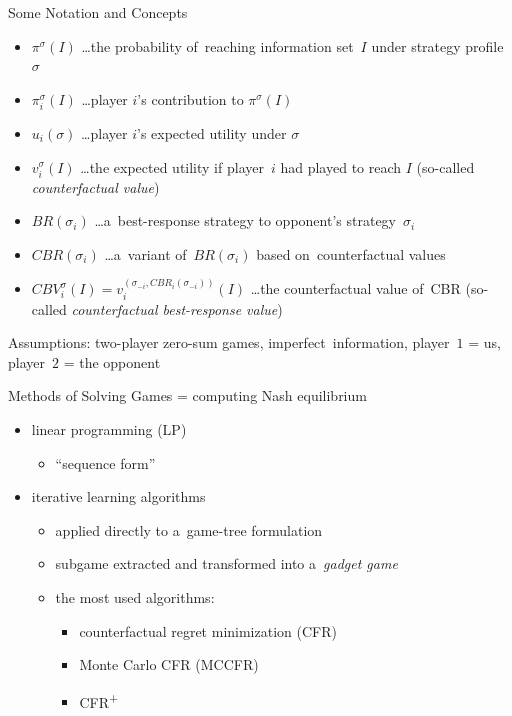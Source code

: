 \documentclass{beamer}
\theoremstyle{definition}
\newcommand{\cfrplus}{CFR\textsuperscript{+}~}
\begin{document}
  \begin{frame}{Some Notation and Concepts}
    \pause
    \begin{itemize}[<+- | alert@+>]
      \item $\pi^{\sigma}(I)$ \ldots the probability of~reaching information set~$I$ under strategy profile~$\sigma$
      \item $\pi_i^{\sigma}(I)$ \ldots player $i$'s contribution to $\pi^{\sigma}(I)$
      \item $u_i(\sigma)$ \ldots player $i$'s expected utility under $\sigma$
      \item $v _i ^{\sigma} (I)$ \ldots the expected utility if player~$i$ had played to reach $I$ (so-called \emph{counterfactual value})
      \item $BR(\sigma_i)$ \ldots a~best-response strategy to opponent's strategy~$\sigma_i$
      \item $CBR(\sigma_i)$ \ldots a~variant of~$BR(\sigma_i)$ based on~counterfactual values
      \item $CBV _i ^\sigma (I) = v _i ^{(\sigma _{-i}, CBR _i (\sigma _{-i} ))} (I)$ \ldots the counterfactual value of~CBR (so-called \emph{counterfactual best-response value})
    \end{itemize}
    \pause

    Assumptions: two-player zero-sum games, imperfect~information, player~$1$ = us, player~$2$ = the opponent
  \end{frame}

  \begin{frame}{Methods of Solving Games}
    = computing Nash equilibrium
    \pause

    \begin{itemize}[<+- | alert@+>]
      \item linear programming (LP)
        \begin{itemize}
          \item ``sequence form''
        \end{itemize}
      \item iterative learning algorithms 
        \begin{itemize}
          \item applied directly to a~game-tree formulation
          \item subgame extracted and transformed into a~\emph{gadget game}
          \item the most used algorithms:
            \begin{itemize}
              \item counterfactual regret minimization (CFR)
              \item Monte Carlo CFR (MCCFR)
              \item \cfrplus
            \end{itemize}
        \end{itemize}
    \end{itemize}
  \end{frame}
\end{document}
